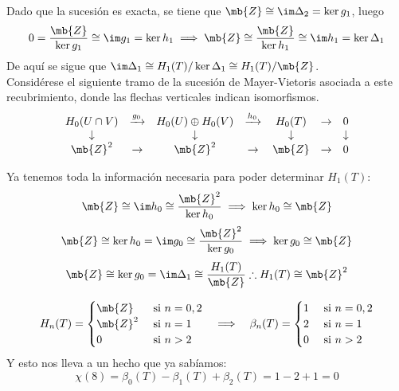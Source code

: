 Dado que la sucesión es exacta, se tiene que
$\mb{Z} \cong \im \Delta_2 =\ker g_1$, luego $$0=\frac{\mb{Z}}{\ker g_1}\cong \im g_1=\ker h_1 \implies \mb{Z}\cong \frac{\mb{Z}}{\ker h_1}\cong \im h_1=\ker \Delta_1$$ De aquí se sigue que $\im \Delta_1 \cong H_1(T)/\ker \Delta_1\cong H_1(T)/\mb{Z}$.
\\

Considérese el siguiente tramo de la sucesión de Mayer-Vietoris asociada a este recubrimiento, donde las flechas verticales indican isomorfismos.
\[\begin{array}{ccccccc}
H_0(U \cap V)	&\xrightarrow{g_0}	&H_0(U)\oplus H_0(V)	&\xrightarrow{h_0}	&H_0(T)		&\rightarrow&0\\
\downarrow		&					&\downarrow			&					&\downarrow	&					&\downarrow\\
\mb{Z}^2		&\rightarrow			&\mb{Z}^2			&\rightarrow			&\mb{Z}		&\rightarrow			&0
\end{array}\]

Ya tenemos toda la información necesaria para poder determinar $H_1(T)$: $$\mb{Z} \cong \im h_0 \cong \frac{\mb{Z}^2}{\ker h_0} \implies \ker h_0 \cong \mb{Z}$$
$$\mb{Z} \cong \ker h_0 =\im g_0 \cong \frac{\mb{Z}^2}{\ker g_0} \implies \ker g_0\cong \mb{Z}$$
$$\mb{Z} \cong \ker g_0 =\im \Delta_1 \cong \frac{H_1(T)}{\mb{Z}} \therefore H_1(T)\cong \mb{Z}^2$$

\begin{teo}\label{HomoToro}
\[\begin{array}{ccc}
H_n(T)=
\begin{cases}
\mb{Z}		&\mbox{ si }n =0,2\\
\mb{Z}^2	&\mbox{ si }n =1\\
0     &\mbox{ si }n > 2
\end{cases}
&\implies&
\beta_n(T)=
\begin{cases}
1 &\mbox{ si }n = 0,2\\
2 &\mbox{ si }n = 1\\
0 &\mbox{ si }n > 2
\end{cases}
\end{array}\]
Y esto nos lleva a un hecho que ya sabíamos: $$\chi(8)=\beta_0(T)-\beta_1(T)+\beta_2(T)=1-2+1=0$$
\end{teo}
